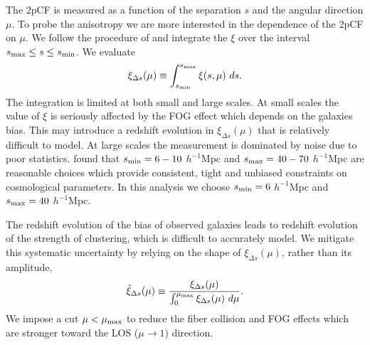 \documentclass[iop]{emulateapj}
\begin{document}
The 2pCF is measured as a function of the separation $s$ and the angular direction $\mu$.
To probe the anisotropy we are more interested in the dependence of the 2pCF on $\mu$.
We follow the procedure of \cite{Li2015} and integrate the $\xi$ over the interval $s_{\rm max} \leq s \leq s_{\rm min}$.
We evaluate
\begin{equation}\label{eq:xideltas}
\xi_{\Delta s} (\mu) \equiv \int_{s_{\rm min}}^{s_{\rm max}} \xi (s,\mu)\ ds.%
\end{equation}
The integration is limited at both small and large scales.
At small scales the value of $\xi$ is seriously affected by the FOG effect \citep{FOG}
which depends on the galaxies bias.
This may introduce a redshift evolution in $\xi_{\Delta s}(\mu)$ that is relatively difficult to model.
At large scales the measurement is dominated by noise due to poor statistics.
\cite{Li2015} found that $s_{\rm min}=6-10$ $h^{-1}$Mpc and $s_{\rm max}=40-70$ $h^{-1}$Mpc are reasonable choices 
which provide consistent, tight and unbiased constraints on cosmological parameters.
In this analysis we choose $s_{\rm min}=6$ $h^{-1}$Mpc and $s_{\rm max}=40$ $h^{-1}$Mpc.

The redshift evolution of the bias of observed galaxies leads to redshift evolution of the strength of clustering,
which is difficult to accurately model.
We mitigate this systematic uncertainty by relying on the shape of $\xi_{\Delta s}(\mu)$, rather than its amplitude,
\begin{equation}\label{eq:norm}
 \hat\xi_{\Delta s}(\mu) \equiv \frac{\xi_{\Delta s}(\mu)}{\int_{0}^{\mu_{\rm max}}\xi_{\Delta s}(\mu)\ d\mu}.
\end{equation}
We impose a cut $\mu<\mu_{\rm max}$ to reduce the fiber collision and FOG effects which are stronger toward the LOS ($\mu\rightarrow1$) direction.
\end{document}
